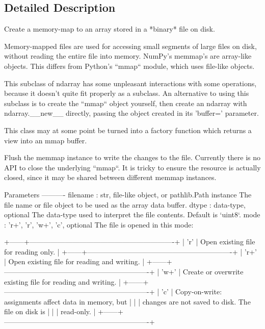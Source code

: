 \subsection{Detailed Description}
\begin{DoxyVerb}Create a memory-map to an array stored in a *binary* file on disk.

Memory-mapped files are used for accessing small segments of large files
on disk, without reading the entire file into memory.  NumPy's
memmap's are array-like objects.  This differs from Python's ``mmap``
module, which uses file-like objects.

This subclass of ndarray has some unpleasant interactions with
some operations, because it doesn't quite fit properly as a subclass.
An alternative to using this subclass is to create the ``mmap``
object yourself, then create an ndarray with ndarray.__new__ directly,
passing the object created in its 'buffer=' parameter.

This class may at some point be turned into a factory function
which returns a view into an mmap buffer.

Flush the memmap instance to write the changes to the file. Currently there
is no API to close the underlying ``mmap``. It is tricky to ensure the
resource is actually closed, since it may be shared between different
memmap instances.


Parameters
----------
filename : str, file-like object, or pathlib.Path instance
    The file name or file object to be used as the array data buffer.
dtype : data-type, optional
    The data-type used to interpret the file contents.
    Default is `uint8`.
mode : {'r+', 'r', 'w+', 'c'}, optional
    The file is opened in this mode:

    +------+-------------------------------------------------------------+
    | 'r'  | Open existing file for reading only.                        |
    +------+-------------------------------------------------------------+
    | 'r+' | Open existing file for reading and writing.                 |
    +------+-------------------------------------------------------------+
    | 'w+' | Create or overwrite existing file for reading and writing.  |
    +------+-------------------------------------------------------------+
    | 'c'  | Copy-on-write: assignments affect data in memory, but       |
    |      | changes are not saved to disk.  The file on disk is         |
    |      | read-only.                                                  |
    +------+-------------------------------------------------------------+


\end{DoxyVerb}

